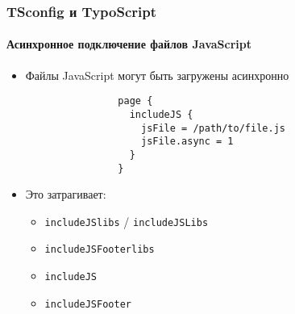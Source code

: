 
\begin{frame}[fragile]
	\frametitle{TSconfig и TypoScript}
	\framesubtitle{Асинхронное подключение файлов JavaScript}

	\begin{itemize}
		\item Файлы JavaScript могут быть загружены асинхронно

			\begin{lstlisting}
				page {
				  includeJS {
				    jsFile = /path/to/file.js
				    jsFile.async = 1
				  }
				}
			\end{lstlisting}

		\item Это затрагивает:

			\begin{itemize}
				\item \texttt{includeJSlibs} / \texttt{includeJSLibs}
				\item \texttt{includeJSFooterlibs}
				\item \texttt{includeJS}
				\item \texttt{includeJSFooter}
			\end{itemize}

	\end{itemize}

\end{frame}


